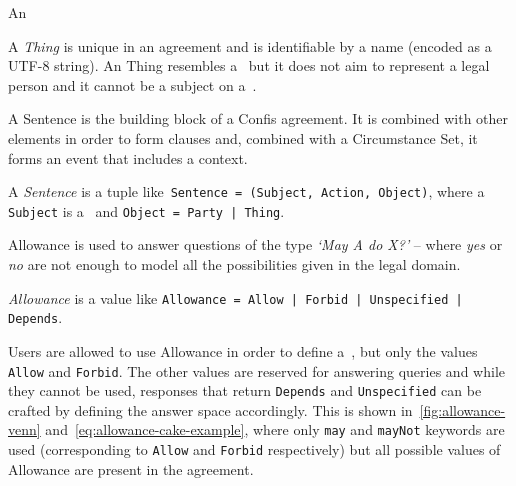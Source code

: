 \begin{definition}[Action]
    \label{def:action}
    An
\end{definition}

\begin{definition}[Thing]
    \label{def:thing}
    A \emph{Thing} is unique in an agreement and is identifiable by a name (encoded as a UTF-8 string).
    An Thing resembles a~ but it does not aim to represent a legal person and it cannot be a subject on a~.
\end{definition}

A Sentence is the building block of a Confis agreement.
It is combined with other elements in order to form clauses and, combined with a Circumstance Set, it forms an event that includes a context.

\begin{definition}[Sentence]
    \label{def:sentence}
    A \emph{Sentence} is a tuple like~\texttt{Sentence = (Subject, Action, Object)}, where a \texttt{Subject} is a~ and \texttt{Object = Party | Thing}.
\end{definition}

Allowance is used to answer questions of the type \emph{`May A do X?'} -- where \emph{yes} or \emph{no} are not enough to model all the possibilities given in the legal domain.


\begin{definition}[Allowance]
    \label{def:allowance}
    \emph{Allowance} is a value like \texttt{Allowance = Allow | Forbid | Unspecified | Depends}.
\end{definition}


\begin{definition}[Compliance]
    \label{def:confis-compliance}
\end{definition}


Users are allowed to use Allowance in order to define a~, but only the values \texttt{Allow} and \texttt{Forbid}.
The other values are reserved for answering queries and while they cannot be used, responses that return \texttt{Depends} and \texttt{Unspecified} can be crafted by defining the answer space accordingly.
This is shown in~\autoref{fig:allowance-venn} and~\autoref{eq:allowance-cake-example}, where only \texttt{may} and \texttt{mayNot} keywords are used (corresponding to \texttt{Allow} and \texttt{Forbid} respectively) but all possible values of Allowance are present in the agreement.

